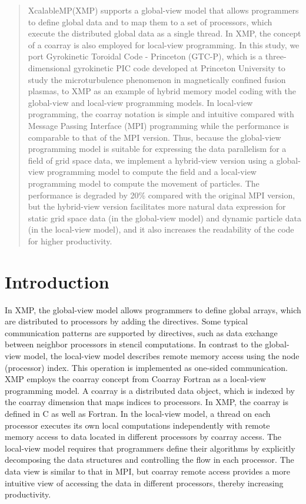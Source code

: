 
\begin{abstract}
XcalableMP(XMP) supports a global-view model that allows programmers to define global data and to map them to a set of processors, which execute the distributed global data as a single thread. In XMP, the concept of a coarray is also employed for local-view programming.
 In this study, we port Gyrokinetic Toroidal Code - Princeton (GTC-P), which is a three-dimensional gyrokinetic PIC code developed at Princeton University to study the microturbulence phenomenon in magnetically confined fusion plasmas, to XMP as an example of hybrid memory model coding with the global-view and local-view programming models.
 In local-view programming, the coarray notation is simple and intuitive compared with Message Passing Interface (MPI) programming while the performance is comparable to that of the MPI version. Thus, because the global-view programming model is suitable for expressing the data parallelism for a field of grid space data, we implement a hybrid-view version using a global-view programming model to compute the field and a local-view programming model to compute the movement of particles. The performance is degraded by 20\% compared with the original MPI version, but the hybrid-view version facilitates more natural data expression for static grid space data (in the global-view model) and dynamic particle data (in the local-view model), and it also increases the readability of the code for higher productivity.
\end{abstract}

\section{Introduction\label{sec1}}

In XMP, the global-view model allows programmers to define global arrays, which are distributed to processors by adding the directives. Some typical communication patterns are supported by directives, such as data exchange between neighbor processors in stencil computations.
In contrast to the global-view model, the local-view model describes remote memory access using the node (processor) index. This operation is implemented as one-sided communication. XMP employs the coarray concept from Coarray Fortran as a local-view programming model. A coarray is a distributed data object, which is indexed by the coarray dimension that maps indices to processors.
In XMP, the coarray is defined in C as well as Fortran. In the local-view model, a thread on each processor executes its own local computations independently with remote memory access to data located in different processors by coarray access. The local-view model requires that programmers define their algorithms by explicitly decomposing the data structures and controlling the flow in each processor. The data view is similar to that in MPI, but coarray remote access provides a more intuitive view of accessing the data in different processors, thereby increasing productivity.

